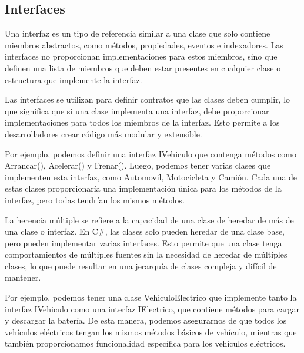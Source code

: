 \documentclass[executivepaper]{article}
\begin{document}
\subsection{Interfaces}

Una interfaz es un tipo de referencia similar a una clase que solo contiene miembros abstractos, como métodos, propiedades, eventos e indexadores. Las interfaces no proporcionan implementaciones para estos miembros, sino que definen una lista de miembros que deben estar presentes en cualquier clase o estructura que implemente la interfaz.

Las interfaces se utilizan para definir contratos que las clases deben cumplir, lo que significa que si una clase implementa una interfaz, debe proporcionar implementaciones para todos los miembros de la interfaz. Esto permite a los desarrolladores crear código más modular y extensible.

Por ejemplo, podemos definir una interfaz IVehiculo que contenga métodos como Arrancar(), Acelerar() y Frenar(). Luego, podemos tener varias clases que implementen esta interfaz, como Automovil, Motocicleta y Camión. Cada una de estas clases proporcionaría una implementación única para los métodos de la interfaz, pero todas tendrían los mismos métodos.

La herencia múltiple se refiere a la capacidad de una clase de heredar de más de una clase o interfaz. En C\#, las clases solo pueden heredar de una clase base, pero pueden implementar varias interfaces. Esto permite que una clase tenga comportamientos de múltiples fuentes sin la necesidad de heredar de múltiples clases, lo que puede resultar en una jerarquía de clases compleja y difícil de mantener.

Por ejemplo, podemos tener una clase VehiculoElectrico que implemente tanto la interfaz IVehiculo como una interfaz IElectrico, que contiene métodos para cargar y descargar la batería. De esta manera, podemos asegurarnos de que todos los vehículos eléctricos tengan los mismos métodos básicos de vehículo, mientras que también proporcionamos funcionalidad específica para los vehículos eléctricos.
\end{document}
